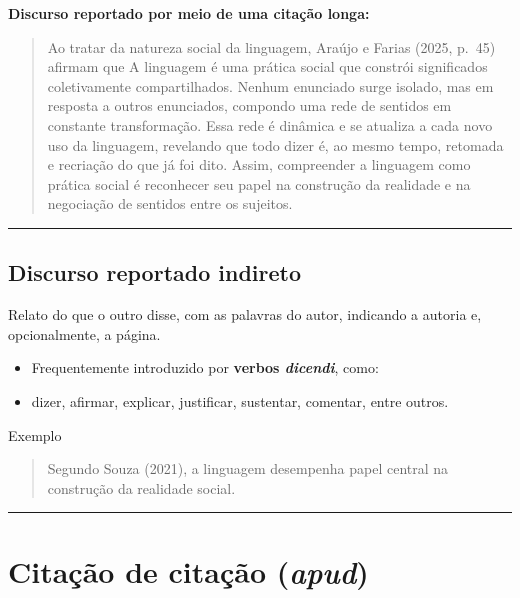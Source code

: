 \documentclass[
  letterpaper,
  DIV=11,
  numbers=noendperiod]{scrreprt}
\providecommand{\tightlist}{%
  \setlength{\itemsep}{0pt}\setlength{\parskip}{0pt}}
\begin{document}
\textbf{Discurso reportado por meio de uma citação longa:}

\begin{quote}
Ao tratar da natureza social da linguagem, Araújo e Farias (2025, p.~45)
afirmam que A linguagem é uma prática social que constrói significados
coletivamente compartilhados. Nenhum enunciado surge isolado, mas em
resposta a outros enunciados, compondo uma rede de sentidos em constante
transformação. Essa rede é dinâmica e se atualiza a cada novo uso da
linguagem, revelando que todo dizer é, ao mesmo tempo, retomada e
recriação do que já foi dito. Assim, compreender a linguagem como
prática social é reconhecer seu papel na construção da realidade e na
negociação de sentidos entre os sujeitos.
\end{quote}

\begin{center}\rule{0.5\linewidth}{0.5pt}\end{center}

\subsection{Discurso reportado
indireto}\label{discurso-reportado-indireto}

Relato do que o outro disse, com as palavras do autor, indicando a
autoria e, opcionalmente, a página.

\begin{itemize}
\tightlist
\item
  Frequentemente introduzido por \textbf{verbos \emph{dicendi}}, como:
\item
  dizer, afirmar, explicar, justificar, sustentar, comentar, entre
  outros.
\end{itemize}

Exemplo

\begin{quote}
Segundo Souza (2021), a linguagem desempenha papel central na construção
da realidade social.
\end{quote}

\begin{center}\rule{0.5\linewidth}{0.5pt}\end{center}

\section{\texorpdfstring{Citação de citação
(\emph{apud})}{Citação de citação (apud)}}\label{citauxe7uxe3o-de-citauxe7uxe3o-apud}
\end{document}

